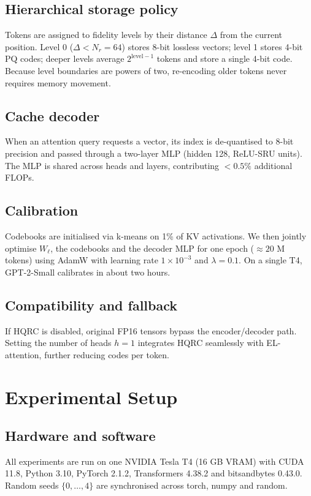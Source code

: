 \documentclass{article}
\begin{document}
\subsection{Hierarchical storage policy}
Tokens are assigned to fidelity levels by their distance \(\Delta\) from the current position. Level 0 (\(\Delta < N_r = 64\)) stores 8-bit lossless vectors; level 1 stores 4-bit PQ codes; deeper levels average \(2^{\text{level}-1}\) tokens and store a single 4-bit code. Because level boundaries are powers of two, re-encoding older tokens never requires memory movement.

\subsection{Cache decoder}
When an attention query requests a vector, its index is de-quantised to 8-bit precision and passed through a two-layer MLP (hidden 128, ReLU-SRU units). The MLP is shared across heads and layers, contributing \(<0.5\%\) additional FLOPs.

\subsection{Calibration}
Codebooks are initialised via k-means on 1\% of KV activations. We then jointly optimise \(W_\ell\), the codebooks and the decoder MLP for one epoch (\(\approx 20\) M tokens) using AdamW with learning rate \(1\times 10^{-3}\) and \(\lambda = 0.1\). On a single T4, GPT-2-Small calibrates in about two hours.

\subsection{Compatibility and fallback}
If HQRC is disabled, original FP16 tensors bypass the encoder/decoder path. Setting the number of heads \(h = 1\) integrates HQRC seamlessly with EL-attention, further reducing codes per token.

\section{Experimental Setup}
\subsection{Hardware and software}
All experiments are run on one NVIDIA Tesla T4 (16 GB VRAM) with CUDA 11.8, Python 3.10, PyTorch 2.1.2, Transformers 4.38.2 and bitsandbytes 0.43.0. Random seeds \(\{0,\dots,4\}\) are synchronised across torch, numpy and random.
\end{document}
